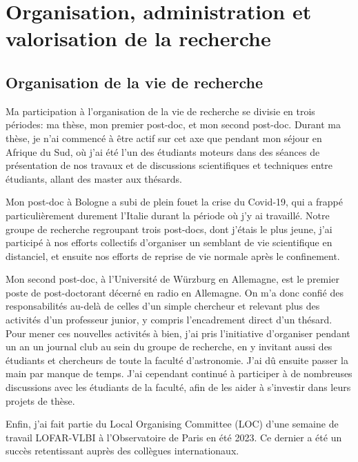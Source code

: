 


\chapter{Organisation, administration et valorisation de la recherche} 

\section{Organisation de la vie de recherche}

\pg
Ma participation \`a l'organisation de la vie de recherche se divisie en trois p\'eriodes: ma th\`ese, mon premier post-doc, et mon second post-doc. Durant ma th\`ese, je n'ai commenc\'e \`a \^etre actif sur cet axe que pendant mon s\'ejour en Afrique du Sud, o\`u j'ai \'et\'e l'un des \'etudiants moteurs dans des s\'eances de pr\'esentation de nos travaux et de discussions scientifiques et techniques entre \'etudiants, allant des master aux th\'esards. 

\pg
Mon post-doc \`a Bologne a subi de plein fouet la crise du Covid-19, qui a frapp\'e particuli\`erement durement l'Italie durant la p\'eriode o\`u j'y ai travaill\'e. Notre groupe de recherche regroupant trois post-docs, dont j'\'etais le plus jeune, j'ai particip\'e \`a nos efforts collectifs d'organiser un semblant de vie scientifique en distanciel, et ensuite nos efforts de reprise de vie normale apr\`es le confinement.%

\pg
Mon second post-doc, \`a l'Universit\'e de W\"urzburg en Allemagne, est le premier poste de post-doctorant d\'ecern\'e en radio en Allemagne. On m'a donc confi\'e des responsabilit\'es au-del\`a de celles d'un simple chercheur et relevant plus des activit\'es d'un professeur junior, y compris l'encadrement direct d'un th\'esard. Pour mener ces nouvelles activit\'es \`a bien, j'ai pris l'initiative d'organiser pendant un an un journal club au sein du groupe de recherche, en y invitant aussi des \'etudiants et chercheurs de toute la facult\'e d'astronomie. J'ai d\^u ensuite passer la main par manque de temps. J'ai cependant continu\'e \`a participer \`a de nombreuses discussions avec les \'etudiants de la facult\'e, afin de les aider \`a s'investir dans leurs projets de th\`ese.

\pg
Enfin, j'ai fait partie du Local Organising Committee (LOC) d'une semaine de travail LOFAR-VLBI \`a l'Observatoire de Paris en \'et\'e 2023. Ce dernier a \'et\'e un succ\`es retentissant aupr\`es des coll\`egues internationaux.


